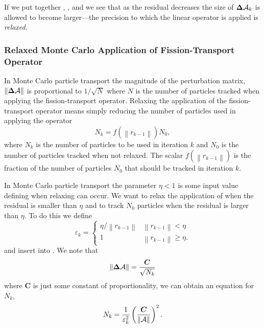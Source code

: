 If we put together , , and  we see that as the residual decreases the size of $\mathbf{\Delta}\mathcal{A}_k$ is allowed to become larger---the precision to which the linear operator \A{} is applied is \emph{relaxed}.

\subsubsection{Relaxed Monte Carlo Application of Fission-Transport Operator}
In Monte Carlo particle transport the magnitude of the perturbation matrix, $\left\|\mathbf{\Delta}\mathcal{A}\right\|$ is proportional to $1/\sqrt{N}$ where $N$ is the number of particles tracked when applying the fission-transport operator.  Relaxing the application of the fission-transport operator means simply reducing the number of particles used in applying the operator
\begin{equation}
    N_k = f\left(\left\|r_{k-1}\right\|\right) N_0,
    \label{eq:RelaxedN}
\end{equation}
where $N_k$ is the number of particles to be used in iteration $k$ and $N_0$ is the number of particles tracked when not relaxed.  The scalar \mbox{$f\left(\left\|r_{k-1}\right\|\right)$} is the fraction of the number of particles $N_0$ that should be tracked in iteration $k$.  

In Monte Carlo particle transport the parameter $\eta < 1$ is some input value defining when relaxing can occur.  We want to relax the application of \A{} when the residual is smaller than $\eta$ and to track $N_0$ particles when the residual is larger than $\eta$.  To do this we define 
\begin{equation}
    \varepsilon_k = \begin{cases}
        \eta/\left\|r_{k-1}\right\| & \left\|r_{k-1}\right\| < \eta \\
        1 & \left\|r_{k-1}\right\| \geq \eta.
    \end{cases}
    \label{eq:epsilonMC}
\end{equation}
and insert into .  We note that \[\left\|\mathbf{\Delta}\mathcal{A}\right\| = \frac{\bm{C}}{\sqrt{N_k}}\] where $\bm{C}$ is just some constant of proportionality, we can obtain an equation for $N_k$,
\begin{equation}
    N_k = \frac{1}{\varepsilon_k^2}\left(\frac{\bm{C}}{\left\|\mathcal{A}\right\|}\right)^2.
    \label{eq:Nk}
\end{equation}

